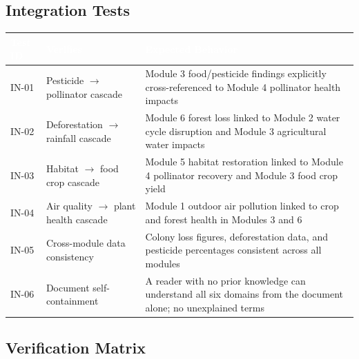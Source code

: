 \documentclass[11pt,letterpaper]{article}
\newcommand{\tableheader}[1]{\textbf{\sffamily\textcolor{white}{#1}}}
\begin{document}
\subsection{Integration Tests}

\begin{center}
\begin{tabularx}{\textwidth}{C{1.5cm}L{4.5cm}X}
\toprule
{}
\tableheader{Test ID} & \tableheader{Verifies} & \tableheader{Expected Behavior} \\
\midrule
IN-01 & Pesticide $\to$ pollinator cascade & Module 3 food/pesticide findings explicitly cross-referenced to Module 4 pollinator health impacts \\
IN-02 & Deforestation $\to$ rainfall cascade & Module 6 forest loss linked to Module 2 water cycle disruption and Module 3 agricultural water impacts \\
IN-03 & Habitat $\to$ food crop cascade & Module 5 habitat restoration linked to Module 4 pollinator recovery and Module 3 food crop yield \\
IN-04 & Air quality $\to$ plant health cascade & Module 1 outdoor air pollution linked to crop and forest health in Modules 3 and 6 \\
IN-05 & Cross-module data consistency & Colony loss figures, deforestation data, and pesticide percentages consistent across all modules \\
IN-06 & Document self-containment & A reader with no prior knowledge can understand all six domains from the document alone; no unexplained terms \\
\bottomrule
\end{tabularx}
\end{center}

\subsection{Verification Matrix}
\end{document}
